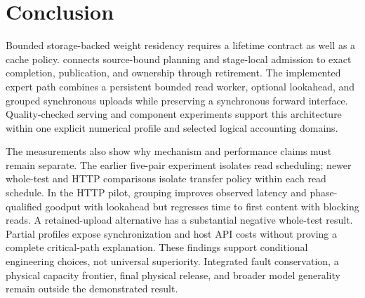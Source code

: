 \section{Conclusion}
\label{sec:conclusion}

Bounded storage-backed weight residency requires a lifetime contract as well
as a cache policy. \system{} connects source-bound planning and stage-local
admission to exact completion, publication, and ownership through retirement.
The implemented expert path combines a persistent bounded read worker,
optional lookahead, and grouped synchronous uploads while preserving a
synchronous forward interface. Quality-checked serving and component
experiments support this architecture within one explicit numerical profile
and selected logical accounting domains.

The measurements also show why mechanism and performance claims must remain
separate. The earlier five-pair experiment isolates read scheduling; newer
whole-test and HTTP comparisons isolate transfer policy within each read
schedule. In the HTTP pilot, grouping improves observed latency and
phase-qualified goodput with lookahead but regresses time to first content
with blocking reads. A retained-upload alternative has a substantial negative
whole-test result. Partial profiles expose synchronization and host API costs
without proving a complete critical-path explanation. These findings support
conditional engineering choices, not universal superiority. Integrated fault
conservation, a physical capacity frontier, final physical release, and
broader model generality remain outside the demonstrated result.
